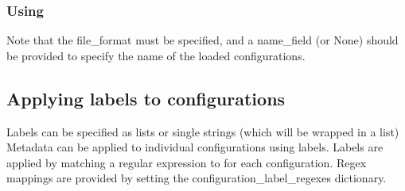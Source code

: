 \documentclass[letterpaper,10pt,english]{sphinxmanual}
\begin{document}
\subsubsection{Using }
\label{\detokenize{basic_example:using-load-data}}
\sphinxAtStartPar
Note that the file\_format must be specified, and a name\_field (or None) should
be provided to specify the name of the loaded configurations.

\begin{sphinxVerbatim}[commandchars=\\\{\}]
   

 
\end{sphinxVerbatim}

\begin{sphinxVerbatim}[commandchars=\\\{\}]
   

  
        \PYG{p}{[}\PYG{p}{]}
\end{sphinxVerbatim}


\subsection{Applying labels to configurations}
\label{\detokenize{basic_example:applying-labels-to-configurations}}
\sphinxAtStartPar
Labels can be specified as lists or single strings (which will be wrapped in a list)
Metadata can be applied to individual configurations using labels. Labels are
applied by matching a regular expression to
 for each configuration. Regex
mappings are provided by setting the configuration\_label\_regexes dictionary.
\end{document}
